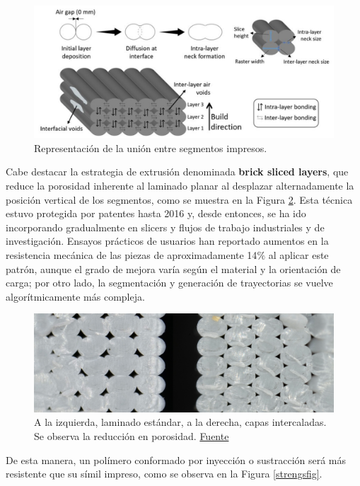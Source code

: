 \begin{figure}[h!]
	\centering
	\includegraphics[width=0.9\linewidth]{imgs/leyer.png}
	\caption{Representación de la unión entre segmentos impresos. \cite{leyerb}}
	\label{leyerfig}
\end{figure} 

Cabe destacar la estrategia de extrusión denominada \textbf{brick sliced layers}, que reduce la porosidad inherente al laminado planar al desplazar alternadamente la posición vertical de los segmentos, como se muestra en la Figura \ref{interlokfig}. Esta técnica estuvo protegida por patentes hasta 2016 y, desde entonces, se ha ido incorporando gradualmente en slicers y flujos de trabajo industriales y de investigación. Ensayos prácticos de usuarios han reportado aumentos en la resistencia mecánica de las piezas de aproximadamente 14$\%$ al aplicar este patrón, aunque el grado de mejora varía según el material y la orientación de carga; por otro lado, la segmentación y generación de trayectorias se vuelve algorítmicamente más compleja.

\begin{figure}[h!]
	\centering
	\includegraphics[width=0.9\linewidth]{imgs/interlocking.png}
	\caption{A la izquierda, laminado estándar, a la derecha, capas intercaladas. Se observa la reducción en porosidad. \href{https://www.cnckitchen.com/blog/brick-layers-make-3d-prints-stronger}{Fuente}}
	\label{interlokfig}
\end{figure} 

De esta manera, un polímero conformado por inyección o sustracción será más resistente que su símil impreso, como se observa en la Figura \ref{strengsfig}. 

